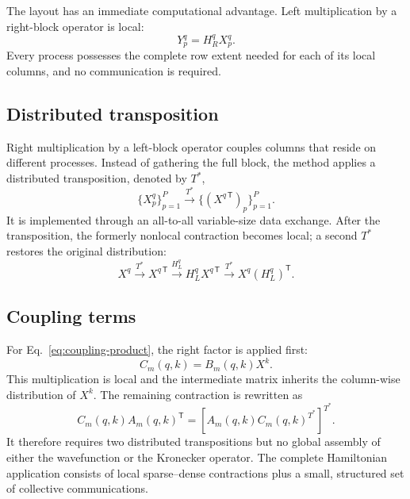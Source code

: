 \documentclass[11pt,a4paper]{article}
\begin{document}
The layout has an immediate computational advantage.  Left multiplication by
a right-block operator is local:
\begin{equation}
  Y_p^q=H_R^qX_p^q.
\end{equation}
Every process possesses the complete row extent needed for each of its local
columns, and no communication is required.

\subsection{Distributed transposition}

Right multiplication by a left-block operator couples columns that reside on
different processes.  Instead of gathering the full block, the method applies
a distributed transposition, denoted by $T^*$,
\begin{equation}
  \{X_p^q\}_{p=1}^{P}
  \xrightarrow{T^*}
  \{(X^{q\,\mathsf T})_p\}_{p=1}^{P}.
\end{equation}
It is implemented through an all-to-all variable-size data exchange.  After
the transposition, the formerly nonlocal contraction becomes local; a second
$T^*$ restores the original distribution:
\begin{equation}
  X^q
  \xrightarrow{T^*}
  X^{q\,\mathsf T}
  \xrightarrow{H_L^q}
  H_L^qX^{q\,\mathsf T}
  \xrightarrow{T^*}
  X^q(H_L^q)^{\mathsf T}.
\end{equation}

\subsection{Coupling terms}

For Eq.~\eqref{eq:coupling-product}, the right factor is applied first:
\begin{equation}
  C_m(q,k)=B_m(q,k)X^k.
\end{equation}
This multiplication is local and the intermediate matrix inherits the
column-wise distribution of $X^k$.  The remaining contraction is rewritten as
\begin{equation}
  C_m(q,k)A_m(q,k)^{\mathsf T}
  =\left[A_m(q,k)C_m(q,k)^{T^*}\right]^{T^*}.
\end{equation}
It therefore requires two distributed transpositions but no global assembly
of either the wavefunction or the Kronecker operator.  The complete
Hamiltonian application consists of local sparse--dense contractions plus a
small, structured set of collective communications.
\end{document}

